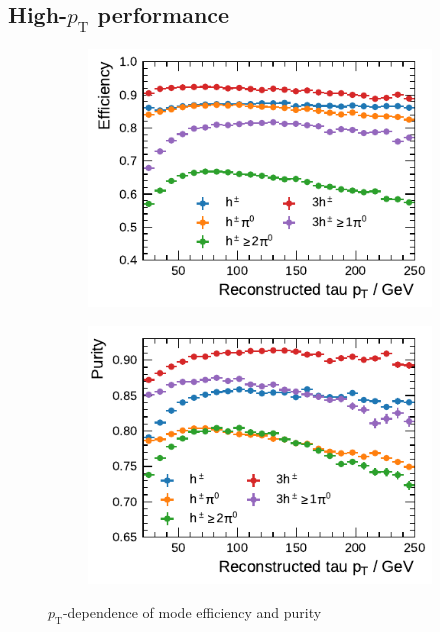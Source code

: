\clearpage
\subsection{High-$p_\text{T}$ performance}
\begin{figure}[htb]
  \begin{subfigure}{0.48\textwidth}
    \centering
    \includegraphics{./figures/decay_mode_classification/highpt/efficiency_profile.pdf}
  \end{subfigure}\hfill
  \begin{subfigure}{0.48\textwidth}
    \centering
    \includegraphics{./figures/decay_mode_classification/highpt/purity_profile.pdf}
  \end{subfigure}
  \caption{$p_\text{T}$-dependence of mode efficiency and purity}
  \label{fig:mode_efficiency_purity_highpt}
\end{figure}

